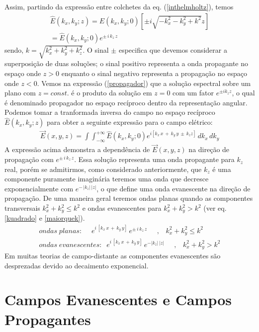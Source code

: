 Assim, partindo da expressão entre colchetes da eq. (\ref{inthelmholtz}), temos
\begin{eqnarray}
\widehat{E}(k_x,k_y;z)=\widehat{E}(k_x,k_y;0) \left[ \pm i \sqrt{-k_x^2-k_y^2+k^2} z \right]  \nonumber \\
=\widehat{E}(k_x,k_y;0)e^{\pm\,i\,k_z\,z}
\label{propagador}
\end{eqnarray}
sendo, $k=\sqrt{k_x^2+k_y^2+k_z^2}$. O sinal $\pm$ especifica que devemos considerar a superposição de duas soluções; o sinal positivo representa a onda propagante no espaço onde $z>0$ enquanto o sinal negativo representa a propagação no espaço onde $z<0$. Vemos na expressão (\ref{propagador}) que a solução espectral sobre um plano com $z=const$. é o produto da solução em  $z=0$ com um fator $e^{\pm i k_z z}$, o qual é denominado propagador no espaço recíproco dentro da representação angular. Podemos tomar a tranformada inversa do campo no espaço recíproco $\widehat{E}(k_x,k_y;z)$ para obter a seguinte expressão para o campo elétrico:
\begin{eqnarray}
\vec{E}(x,y,z)=\int \int_{- \infty}^{+ \infty} \widehat{E}(k_x,k_y;0) e^{i[k_x\,x\,+\,k_y\,y\,\pm\,k_z z]}\,dk_x\,dk_y
\label{campoeletrico}
\end{eqnarray}
A expressão acima demonstra a dependência de $\vec{E}(x,y,z)$ na direção de propagação com $e^{\pm\,i\,k_z\,z}$. Essa solução representa uma onda propagante para $k_z$ real, porém se admitirmos, como considerado anteriormente, que $k_z$ é uma componente puramente imaginária teremos uma onda que decresce exponencialmente com $e^{-\,|k_z|\,|z|}$, o que define uma onda evanescente na direção de propagação. De uma maneira geral teremos ondas planas quando as componentes transversais $k_x^2+k_y^2 \leq k^2$ e ondas evanescentes para $k_x^2+k_y^2>k^2$ (ver eq. \ref{kuadrado} e \ref{maiorquek}).
\begin{eqnarray}
ondas \; planas:\;\;\;\;\, e^{i\,[k_x\,x\,+\,k_y\,y]}\,e^{\pm\,i\,k_z\,z}\;\;\;\;\;,\;\;\;k_x^2+k_y^2 \leq k^2 \nonumber \\
ondas \; evanescentes:\;\; e^{i\,[k_x\,x\,+\,k_y\,y]}\,e^{-|k_z|\,|z|}\;\;\;\;\;,\;\;\;k_x^2+k_y^2>k^2
\end{eqnarray}
Em muitas teorias de campo-distante as componentes evanescentes são desprezadas devido ao decaimento exponencial. 

\section{Campos Evanescentes e Campos Propagantes}
\label{camposevanescente}
